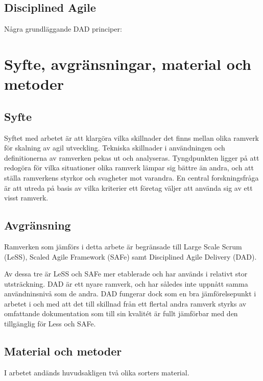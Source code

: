 	
	\subsection{Disciplined Agile}
	
	
	Några grundläggande DAD principer: \cite{dad_principles}
		
	\newpage

\section{Syfte, avgränsningar, material och metoder}
	
	
	\subsection{Syfte}
	
	Syftet med arbetet är att klargöra vilka skillnader det finns mellan olika ramverk för skalning av agil utveckling. Tekniska skillnader i användningen och definitionerna av ramverken pekas ut och analyseras.
	Tyngdpunkten ligger på att redogöra för vilka situationer olika ramverk lämpar sig bättre än andra, och att ställa ramverkens styrkor och svagheter mot varandra. \newline
	En central forskningsfråga är att utreda på basis av vilka kriterier ett företag väljer att använda sig av ett visst ramverk.
	
	
	
	
	\subsection{Avgränsning}
	
	Ramverken som jämförs i detta arbete är begränsade till Large Scale Scrum (LeSS), Scaled Agile Framework (SAFe) samt Disciplined Agile Delivery (DAD).
	
	Av dessa tre är LeSS och SAFe mer etablerade och har används i relativt stor utsträckning. DAD är ett nyare ramverk, och har således inte uppnått samma användninsnivå som de andra. DAD fungerar dock som en bra jämförelsepunkt i arbetet i och med att det till skillnad från ett flertal andra ramverk styrks av omfattande dokumentation som till sin kvalitét är fullt jämförbar med den tillgänglig för Less och SAFe. \cite{ask_matrix}
	
	
	\subsection{Material och metoder}
	I arbetet andänds huvudsakligen två olika sorters material.
	

